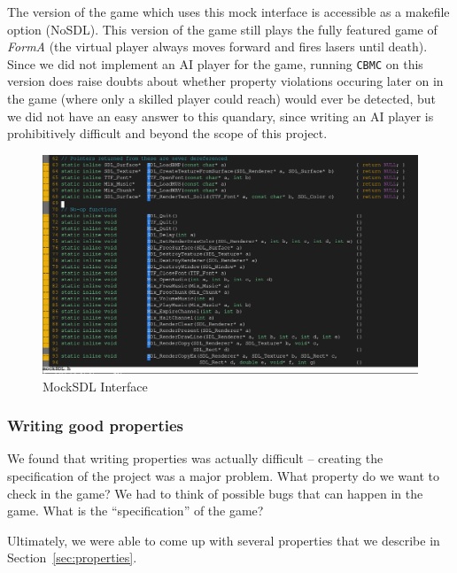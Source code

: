 \documentclass{article}
\newcommand{\Name}{\textit{FormA}\xspace}
\newcommand{\cbmc}{\texttt{CBMC}}
\begin{document}
            The version of the game which uses this mock interface is accessible
            as a makefile option (NoSDL). This version of the game still plays
            the fully featured game of \Name{} (the virtual player always moves
            forward and fires lasers until death). Since we did not implement
            an AI player for the game, running \cbmc{} on this version does
            raise doubts about whether property violations occuring later on in
            the game (where only a skilled player could reach) would ever be
            detected, but we did not have an easy answer to this quandary, since
            writing an AI player is prohibitively difficult and beyond the scope
            of this project.

            \begin{figure}[h!]
                \includegraphics[width=\linewidth]{mock-sdl.png}
                \caption{MockSDL Interface}
                \label{fig:mock-sdl}
            \end{figure}

        \subsubsection{Writing good properties}

            We found that writing properties was actually difficult -- creating
            the specification of the project was a major problem. What property
            do we want to check in the game? We had to think of possible bugs
            that can happen in the game. What is the ``specification'' of the
            game?

            Ultimately, we were able to come up with several properties that we
            describe in Section~\ref{sec:properties}.
\end{document}
